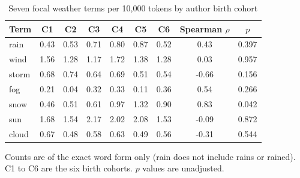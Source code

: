 \begin{table}[t]
\centering
\begin{threeparttable}
\caption{Seven focal weather terms per 10,000 tokens by author birth cohort}
\label{tab:terms}
\begin{tabular}{lcccccccc}
\toprule
Term & C1 & C2 & C3 & C4 & C5 & C6 & Spearman $\rho$ & $p$ \\
\midrule
rain & 0.43 & 0.53 & 0.71 & 0.80 & 0.87 & 0.52 & 0.43 & 0.397 \\
wind & 1.56 & 1.28 & 1.17 & 1.72 & 1.38 & 1.28 & 0.03 & 0.957 \\
storm & 0.68 & 0.74 & 0.64 & 0.69 & 0.51 & 0.54 & -0.66 & 0.156 \\
fog & 0.21 & 0.04 & 0.32 & 0.33 & 0.11 & 0.36 & 0.54 & 0.266 \\
snow & 0.46 & 0.51 & 0.61 & 0.97 & 1.32 & 0.90 & 0.83 & 0.042 \\
sun & 1.68 & 1.54 & 2.17 & 2.02 & 2.08 & 1.53 & -0.09 & 0.872 \\
cloud & 0.67 & 0.48 & 0.58 & 0.63 & 0.49 & 0.56 & -0.31 & 0.544 \\
\bottomrule
\end{tabular}
\begin{tablenotes}[flushleft]
\footnotesize
\item Counts are of the exact word form only (rain does not include rains or rained). C1 to C6 are the six birth cohorts. $p$ values are unadjusted.
\end{tablenotes}
\end{threeparttable}
\end{table}
